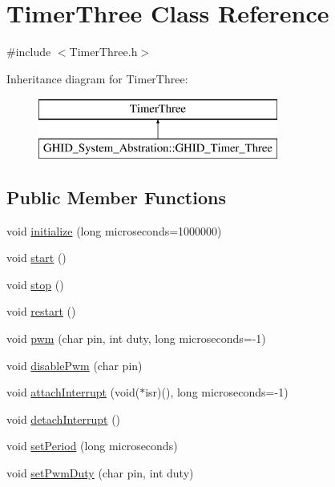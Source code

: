 \hypertarget{class_timer_three}{\section{\-Timer\-Three \-Class \-Reference}
\label{class_timer_three}
}


{\ttfamily \#include $<$\-Timer\-Three.\-h$>$}

\-Inheritance diagram for \-Timer\-Three\-:\begin{figure}[H]
\begin{center}
\leavevmode
\includegraphics[height=2.000000cm]{class_timer_three}
\end{center}
\end{figure}
\subsection*{\-Public \-Member \-Functions}
\begin{DoxyCompactItemize}
\item 
void \hyperlink{class_timer_three_abbb9765934122c994af2330565d08051}{initialize} (long microseconds=1000000)
\item 
void \hyperlink{class_timer_three_a984b93d8d589a3c9182014895ae7254f}{start} ()
\item 
void \hyperlink{class_timer_three_a1cfba738478a3638392056dfb56fcdd0}{stop} ()
\item 
void \hyperlink{class_timer_three_a60cc5d2a92143aaeea40043555317a3b}{restart} ()
\item 
void \hyperlink{class_timer_three_a2a3dd3e5126affb581e87e4c23468603}{pwm} (char pin, int duty, long microseconds=-\/1)
\item 
void \hyperlink{class_timer_three_a55efff2181e4bd181eaaa0b263299c90}{disable\-Pwm} (char pin)
\item 
void \hyperlink{class_timer_three_ae8d5556c0724f440d4eadc7d038dc9db}{attach\-Interrupt} (void($\ast$isr)(), long microseconds=-\/1)
\item 
void \hyperlink{class_timer_three_a1055bcb7e6af13f027a3a193817e9825}{detach\-Interrupt} ()
\item 
void \hyperlink{class_timer_three_ae53099b4ba93f49ee8b65bfc1ab21322}{set\-Period} (long microseconds)
\item 
void \hyperlink{class_timer_three_a7a52730cb4c9d2db7477f95f217f641a}{set\-Pwm\-Duty} (char pin, int duty)
\end{DoxyCompactItemize}
